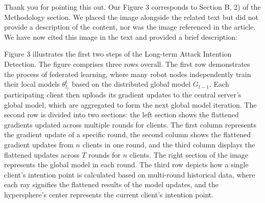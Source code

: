 \documentclass[a4paper,twoside,11pt,dvipsnames]{reviewresponse}
\begin{document}


Thank you for pointing this out. Our Figure 3 corresponds to Section B, 2) of the Methodology section. We placed the image alongside the related text but did not provide a description of the content, nor was the image referenced in the article. We have now cited this image in the text and provided a brief description:

Figure 3 illustrates the first two steps of the Long-term Attack Intention Detection. The figure comprises three rows overall. The first row demonstrates the process of federated learning, where many robot nodes independently train their local models \( \theta^t_{l_1} \) based on the distributed global model \( G_{t-1} \). Each participating client then uploads its gradient updates to the central server's global model, which are aggregated to form the next global model iteration. The second row is divided into two sections: the left section shows the flattened gradients updated across multiple rounds for clients. The first column represents the gradient update of a specific round, the second column shows the flattened gradient updates from \( n \) clients in one round, and the third column displays the flattened updates across \( T \) rounds for \( n \) clients. The right section of the image represents the global model in each round. The third row depicts how a single client's intention point is calculated based on multi-round historical data, where each ray signifies the flattened results of the model updates, and the hypersphere's center represents the current client's intention point.
\end{document}
